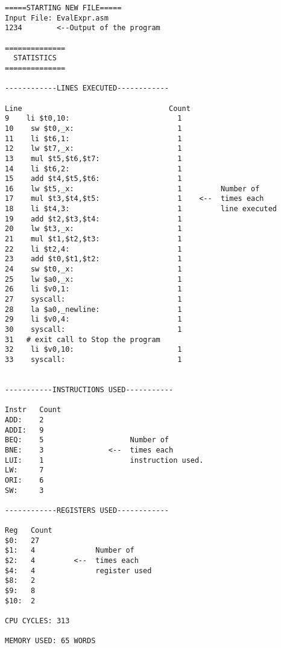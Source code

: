 \begin{verbatim}
=====STARTING NEW FILE=====
Input File: EvalExpr.asm
1234		<--Output of the program

==============
  STATISTICS
==============

------------LINES EXECUTED------------

Line                                  Count   
9    li $t0,10:                         1
10    sw $t0,_x:                        1
11    li $t6,1:                         1
12    lw $t7,_x:                        1
13    mul $t5,$t6,$t7:                  1
14    li $t6,2:                         1
15    add $t4,$t5,$t6:                  1
16    lw $t5,_x:                        1         Number of
17    mul $t3,$t4,$t5:                  1    <--  times each
18    li $t4,3:                         1         line executed
19    add $t2,$t3,$t4:                  1
20    lw $t3,_x:                        1
21    mul $t1,$t2,$t3:                  1
22    li $t2,4:                         1
23    add $t0,$t1,$t2:                  1
24    sw $t0,_x:                        1
25    lw $a0,_x:                        1
26    li $v0,1:                         1
27    syscall:                          1
28    la $a0,_newline:                  1
29    li $v0,4:                         1
30    syscall:                          1
31   # exit call to Stop the program
32    li $v0,10:                        1
33    syscall:                          1


-----------INSTRUCTIONS USED-----------

Instr   Count
ADD:    2
ADDI:   9
BEQ:    5                    Number of
BNE:    3               <--  times each
LUI:    1                    instruction used.
LW:     7
ORI:    6
SW:     3

------------REGISTERS USED------------

Reg   Count
$0:   27
$1:   4              Number of
$2:   4         <--  times each
$4:   4              register used
$8:   2
$9:   8
$10:  2

CPU CYCLES: 313

MEMORY USED: 65 WORDS
\end{verbatim}

